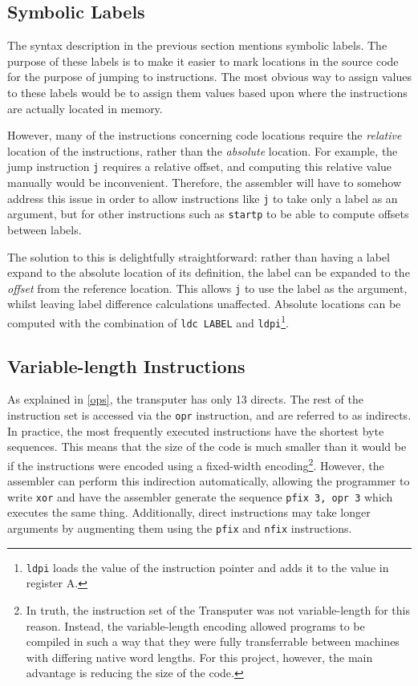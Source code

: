 \subsection{Symbolic Labels}

The syntax description in the previous section mentions symbolic labels. The
purpose of these labels is to make it easier to mark locations in the source
code for the purpose of jumping to instructions. The most obvious way to assign
values to these labels would be to assign them values based upon where the
instructions are actually located in memory.

However, many of the instructions concerning code locations require the
\textit{relative} location of the instructions, rather than the
\textit{absolute} location. For example, the jump instruction \texttt{j}
requires a relative offset, and computing this relative value manually would be
inconvenient. Therefore, the assembler will have to somehow address this issue
in order to allow instructions like \texttt{j} to take only a label as an
argument, but for other instructions such as \texttt{startp} to be able to
compute offsets between labels.

The solution to this is delightfully straightforward: rather than having a label
expand to the absolute location of its definition, the label can be expanded to
the \textit{offset} from the reference
location\textsuperscript{\cite{supervisor}}. This allows \texttt{j} to use the
label as the argument, whilst leaving label difference calculations unaffected.
Absolute locations can be computed with the combination of \texttt{ldc LABEL}
and \texttt{ldpi}\footnote{\texttt{ldpi} loads the value of the instruction
pointer and adds it to the value in register A.}.

\subsection{Variable-length Instructions} \label{var-len}

As explained in \ref{ops}, the \Gls{transputer} has only 13 \gls{direct}s. The
rest of the instruction set is accessed via the \texttt{opr} instruction, and
are referred to as \gls{indirect}s. In practice, the most frequently executed
instructions have the shortest byte sequences. This means that the size of the
code is much smaller than it would be if the instructions were encoded using a
fixed-width encoding\footnote{In truth, the instruction set of the Transputer
was not variable-length for this reason. Instead, the variable-length encoding
allowed programs to be compiled in such a way that they were fully transferrable
between machines with differing native word lengths. For this project, however,
the main advantage is reducing the size of the code.}. However, the assembler
can perform this indirection automatically, allowing the programmer to write
\texttt{xor} and have the assembler generate the sequence \texttt{pfix 3, opr 3}
which executes the same thing. Additionally, direct instructions may take longer
arguments by augmenting them using the \texttt{pfix} and \texttt{nfix}
instructions.

